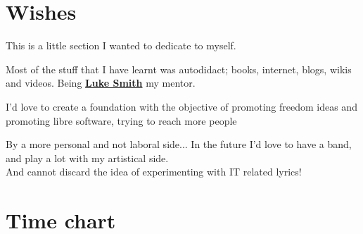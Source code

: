\documentclass[%
               doublesided,
               paper=a4,
               fontsize=10pt
              ]{my-resume}
\begin{document}
{    \section{Wishes}
    This is a little section I wanted to dedicate to myself.

    \medskip
    Most of the stuff that I have learnt was autodidact; books, internet, blogs, wikis and videos. 
    Being \textbf{\href{https://lukesmith.xyz/}{Luke Smith}} my mentor.

    \medskip
    I'd love to create a foundation with the objective of promoting freedom ideas and promoting libre software, trying to reach more people

    \medskip
    By a more personal and not laboral side... In the future I'd love to have a band, and play a lot with my artistical side.\\
    And cannot discard the idea of experimenting with IT related lyrics!

    \section{Time chart}
}
\makebody
\end{document}

